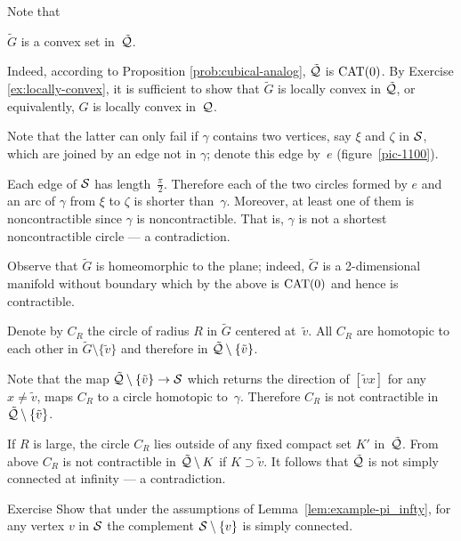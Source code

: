 Note that 
\begin{clm}{}\label{tilde-G-convex}
$\tilde G$ is a convex set in~$\tilde{\mathcal{Q}}$.
\end{clm}


Indeed, according to Proposition \ref{prob:cubical-analog},
$\tilde{\mathcal{Q}}$ is $\mathrm{CAT}(0)$.
By Exercise \ref{ex:locally-convex},
it is sufficient to show that $\tilde G$ is locally convex in $\tilde{\mathcal{Q}}$,
or equivalently, $G$ is locally convex in~$\mathcal{Q}$.

Note that the latter can only fail if $\gamma$ contains two vertices, say $\xi$ 
and 
$\zeta$ in $\mathcal{S}$,
which are joined by an edge not in $\gamma$; 
denote this edge by~$e$ (figure~\ref{pic-1100}).

Each edge of $\mathcal{S}$ has length~$\tfrac\pi2$.
Therefore each of the two circles formed by $e$ and an arc of $\gamma$
from $\xi$ to $\zeta$ is shorter than~$\gamma$.
Moreover,
at least one of them is noncontractible 
since $\gamma$ is 
noncontractible.
That is, 
$\gamma$ is not a shortest noncontractible circle --- a contradiction.
\claimqeds

Observe that $\tilde G$ is homeomorphic to the plane; indeed, $\tilde G$ is
a 2-dimensional manifold without boundary which
by the above is $\mathrm{CAT}(0)$ and hence is contractible.

Denote by $C_R$ the circle of radius $R$ in $\tilde G$ centered at~$\tilde v$.
All $C_R$ are homotopic to each other in $\tilde G\setminus\{\tilde v\}$ and therefore in $\tilde{\mathcal{Q}}\setminus \{\tilde v\}$.

Note that the map $\tilde{\mathcal{Q}}\setminus \{\tilde v\}\to \mathcal{S}$
which returns the direction of $[{\tilde v}{x}]$ for any $x\ne \tilde v$, maps $C_R$ to a circle homotopic to~$\gamma$.
Therefore $C_R$ is not contractible in $\tilde{\mathcal{Q}}\setminus \{\tilde v\}$.

If $R$ is large, the circle $C_R$ lies outside of any fixed compact set $K'$ in~$\tilde{\mathcal{Q}}$.
From above $C_R$ is not contractible in $\tilde{\mathcal{Q}}\setminus K$
if $K\supset \tilde v$.
It follows that $\tilde{\mathcal{Q}}$ is not simply connected at infinity --- a contradiction.
\qeds

\begin{thm}[!]{Exercise}\label{ex:example-pi_infty-new}
Show that under the assumptions of Lemma~\ref{lem:example-pi_infty},
for any vertex $v$ in $\mathcal{S}$
the complement $\mathcal{S}\setminus\{v\}$ is simply connected.
\end{thm}

